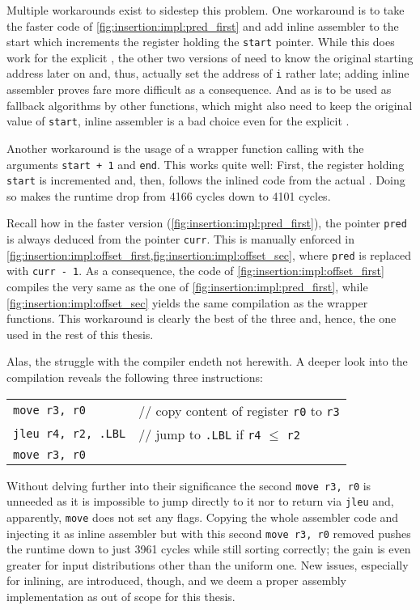 Multiple workarounds exist to sidestep this problem.
One workaround is to take the faster code of \cref{fig:insertion:impl:pred_first} and add inline assembler to the start which increments the register holding the \lstinline|start| pointer.
While this does work for the explicit \IS{}, the other two versions of \IS{} need to know the original starting address later on and, thus, actually set the address of \lstinline|i| rather late;
adding inline assembler proves fare more difficult as a consequence.
And as \IS{} is to be used as fallback algorithms by other functions, which might also need to keep the original value of \lstinline|start|, inline assembler is a bad choice even for the explicit \IS{}.

Another workaround is the usage of a wrapper function calling \IS{} with the arguments \lstinline|start + 1| and \lstinline|end|.
This works quite well:
First, the register holding \lstinline|start| is incremented and, then, follows the inlined code from the actual \IS{}.
Doing so makes the runtime drop from 4166 cycles down to 4101 cycles.

Recall how in the faster version (\cref{fig:insertion:impl:pred_first}), the pointer \lstinline|pred| is always deduced from the pointer \lstinline|curr|.
This is manually enforced in \cref{fig:insertion:impl:offset_first,fig:insertion:impl:offset_sec}, where \lstinline|pred| is replaced with \lstinline|curr - 1|.
As a consequence, the code of \cref{fig:insertion:impl:offset_first} compiles the very same as the one of \cref{fig:insertion:impl:pred_first}, while \cref{fig:insertion:impl:offset_sec} yields the same compilation as the wrapper functions.
This workaround is clearly the best of the three and, hence, the one used in the rest of this thesis.

Alas, the struggle with the compiler endeth not herewith.
A deeper look into the compilation reveals the following three instructions:
\begin{center}
	\begin{tabular}{ll}
		\lstinline|move r3, r0| & // copy content of register \lstinline|r0| to \lstinline|r3|
		\\ \lstinline|jleu r4, r2, .LBL| & // jump to \lstinline|.LBL| if \lstinline|r4| \(\le\) \lstinline|r2|
		\\ \lstinline|move r3, r0| &
	\end{tabular}
\end{center}
Without delving further into their significance \Dash the second \lstinline|move r3, r0| is unneeded as it is impossible to jump directly to it nor to return via \lstinline|jleu| and, apparently, \lstinline|move| does not set any flags.
Copying the whole assembler code and injecting it as inline assembler but with this second \lstinline|move r3, r0| removed pushes the runtime down to just 3961 cycles while still sorting correctly;
the gain is even greater for input distributions other than the uniform one.
New issues, especially for inlining, are introduced, though, and we deem a proper assembly implementation as out of scope for this thesis.

